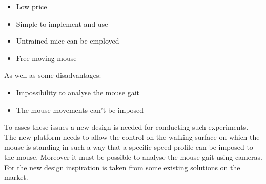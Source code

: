 \documentclass[12pt,a4paper]{article}
\begin{document}
\begin{itemize}
	\item Low price
	\item Simple to implement and use
	\item Untrained mice can be employed
	\item Free moving mouse
\end{itemize}
As well as some disadvantages:
\begin{itemize}
	\item Impossibility to analyse the mouse gait
	\item The mouse movements can't be imposed
\end{itemize}
To asses these issues a new design is needed for conducting such experiments. The new platform needs to allow the control on the walking surface on which the mouse is standing in such a way that a specific speed profile can be imposed to the mouse. Moreover it must be possible to analyse the mouse gait using cameras. \\
For the new design inspiration is taken from some existing solutions on the market. 
\end{document}
